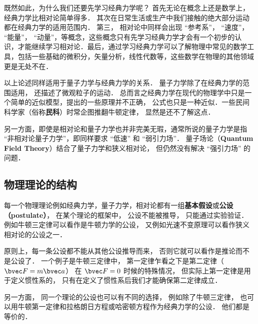 既然如此，为什么我们还要先学习经典力学呢？ 首先无论在概念上还是数学上，经典力学比相对论简单得多． 其次在日常生活或生产中我们接触的绝大部分运动都在经典力学的适用范围内． 第三， 相对论中同样会出现 “参考系”， “速度”， “能量”， “动量”，等概念，这些概念只有先学习经典力学才会有一个初步的认识，才能继续学习相对论．最后，通过学习经典力学可以了解物理中常见的数学工具，包括一些基础的微积分，矢量分析，线性代数等，这些数学在物理的其他领域更是无处不在．

以上论述同样适用于量子力学与经典力学的关系． 量子力学除了在经典力学的范围适用， 还描述了微观粒子的运动． 总而言之经典力学在现代的物理学中只是一个简单的近似模型，提出的一些原理并不正确， 公式也只是一种近似．一些民间科学家（俗称\textbf{民科}）时常企图推翻牛顿定律， 显然是还不了解这点．

另一方面，即使是相对论和量子力学也并非完美无瑕，通常所说的量子力学是指 “非相对论量子力学”，即同样要求 “低速” 和 “弱引力场”． 量子场论（\textbf{Quantum Field Theory}）结合了量子力学和狭义相对论， 但仍然没有解决 “强引力场” 的问题．

\subsection{物理理论的结构}
每一个物理理论例如经典力学，量子力学，相对论都有一组\textbf{基本假设}或\textbf{公设（postulate）}， 在某个理论的框架中， 公设不能被推导， 只能通过实验验证． 例如牛顿三定律可以看作是牛顿力学的公设， 又例如光速不变原理可以看作狭义相对论的公设之一．

原则上，每一条公设都不能从其他公设推导而来， 否则它就可以看作是推论而不是公设了． 一个例子是牛顿三定律中， 第一定律乍看之下是第二定律（$\bvec F = m\bvec a$） 在 $\bvec F = 0$ 时候的特殊情况， 但实际上第一定律是用于定义惯性系的， 只有在定义了惯性系后我们才能确保第二定律成立．

另一方面， 同一个理论的公设也可以有不同的选择， 例如除了牛顿三定律， 也可以用牛顿第一定律和拉格朗日方程或哈密顿方程作为经典力学的公设． 他们都是等价的．
